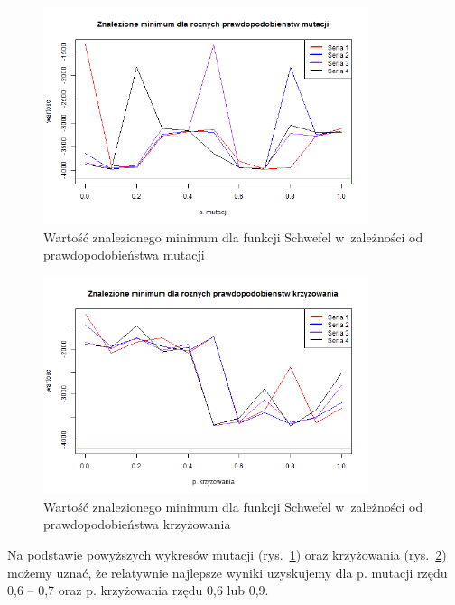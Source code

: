 \documentclass[11pt, a4paper]{article}
\newcommand{\fbi}{\leavevmode{\parindent=1em\indent}}
\begin{document}
\begin{figure}[H]
	\begin{center}
		\includegraphics[width=0.85\textwidth]{./assets/Schwefel2.png}
		\caption{Wartość znalezionego minimum dla funkcji Schwefel w~zależności od prawdopodobieństwa mutacji}
		\label{fig:schwefel2}
	\end{center}
\end{figure}

\begin{figure}[H]
	\begin{center}
		\includegraphics[width=0.85\textwidth]{./assets/Schwefel3.png}
		\caption{Wartość znalezionego minimum dla funkcji Schwefel w~zależności od prawdopodobieństwa krzyżowania}
		\label{fig:schwefel3}
	\end{center}
\end{figure}

\fbi
Na podstawie powyższych wykresów mutacji (rys.~\ref{fig:schwefel2}) oraz krzyżowania (rys.~\ref{fig:schwefel3}) możemy uznać, że relatywnie najlepsze wyniki uzyskujemy dla p. mutacji rzędu 0,6 -- 0,7 oraz p. krzyżowania rzędu 0,6 lub 0,9.
\end{document}
